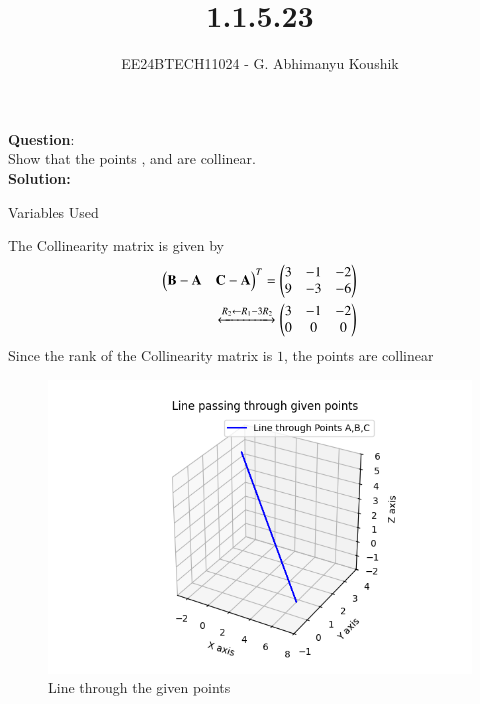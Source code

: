 \documentclass[journal]{IEEEtran}
\begin{document}

\vspace{3cm}

\title{1.1.5.23}
\author{EE24BTECH11024 - G. Abhimanyu Koushik
}
{\let\newpage\relax\maketitle}

\renewcommand{\thefigure}{\theenumi}
\renewcommand{\thetable}{\theenumi}
\setlength{\intextsep}{10pt} %


\renewcommand{\thetable}{\theenumi}


\textbf{Question}:\\
Show that the points ,  and  are collinear.
\\
\textbf{Solution: }
\begin{table}[h!]    
  \centering
  
  \caption{Variables Used}
  \label{tab10.5.3.9.1}
\end{table}
The Collinearity matrix is given by\\
\begin{align}
\begin{pmatrix}
   \mathbf{B}-\mathbf{A} & \mathbf{C}-\mathbf{A}
 \end{pmatrix}^T = \begin{pmatrix}
   3 & -1 & -2
   \\
   9 & -3 & -6
   \end{pmatrix}\\
 \xleftrightarrow[]{R_2 \leftarrow {R_1-3R_2}}
 \begin{pmatrix}
   3 & -1 & -2
   \\
   0 & 0 & 0
   \end{pmatrix}
\end{align}
Since the rank of the Collinearity matrix is $1$, the points are collinear
\begin{figure}[h!]
   \centering
   \includegraphics[width=0.7\linewidth]{figs/fig.png}
   \caption{Line through the given points}
   \label{stemplot}
\end{figure}
\end{document}

